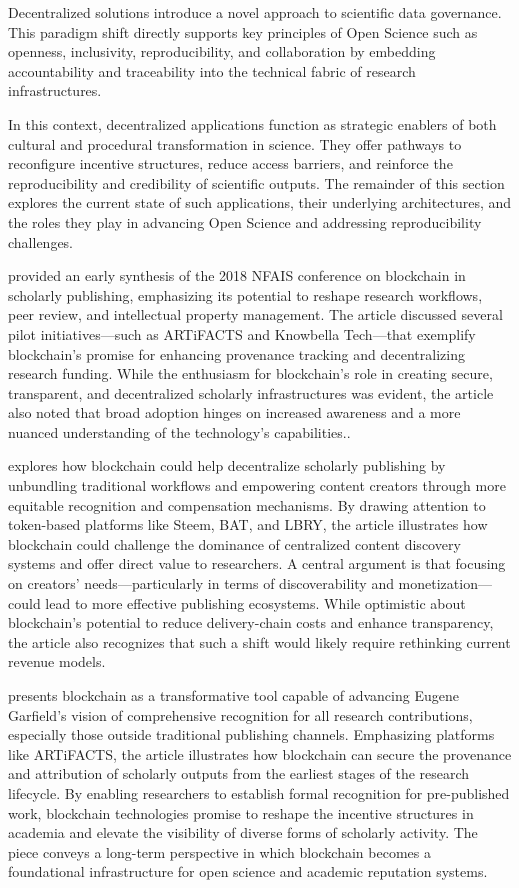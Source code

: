 \documentclass{article}
\begin{document}
Decentralized solutions introduce a novel approach to scientific data governance. This paradigm shift directly supports key principles of Open Science such as openness, inclusivity, reproducibility, and collaboration by embedding accountability and traceability into the technical fabric of research infrastructures.

In this context, decentralized applications function as strategic enablers of both cultural and procedural transformation in science. They offer pathways to reconfigure incentive structures, reduce access barriers, and reinforce the reproducibility and credibility of scientific outputs. The remainder of this section explores the current state of such applications, their underlying architectures, and the roles they play in advancing Open Science and addressing reproducibility challenges.

\cite{lawlor_overview_2018} provided an early synthesis of the 2018 NFAIS conference on blockchain in scholarly publishing, emphasizing its potential to reshape research workflows, peer review, and intellectual property management. The article discussed several pilot initiatives—such as ARTiFACTS and Knowbella Tech—that exemplify blockchain’s promise for enhancing provenance tracking and decentralizing research funding. While the enthusiasm for blockchain's role in creating secure, transparent, and decentralized scholarly infrastructures was evident, the article also noted that broad adoption hinges on increased awareness and a more nuanced understanding of the technology's capabilities..

\cite{holmen_blockchain_2018} explores how blockchain could help decentralize scholarly publishing by unbundling traditional workflows and empowering content creators through more equitable recognition and compensation mechanisms. By drawing attention to token-based platforms like Steem, BAT, and LBRY, the article illustrates how blockchain could challenge the dominance of centralized content discovery systems and offer direct value to researchers. A central argument is that focusing on creators' needs—particularly in terms of discoverability and monetization—could lead to more effective publishing ecosystems. While optimistic about blockchain’s potential to reduce delivery-chain costs and enhance transparency, the article also recognizes that such a shift would likely require rethinking current revenue models.

\cite{kochalko_making_2019} presents blockchain as a transformative tool capable of advancing Eugene Garfield’s vision of comprehensive recognition for all research contributions, especially those outside traditional publishing channels. Emphasizing platforms like ARTiFACTS, the article illustrates how blockchain can secure the provenance and attribution of scholarly outputs from the earliest stages of the research lifecycle. By enabling researchers to establish formal recognition for pre-published work, blockchain technologies promise to reshape the incentive structures in academia and elevate the visibility of diverse forms of scholarly activity. The piece conveys a long-term perspective in which blockchain becomes a foundational infrastructure for open science and academic reputation systems.
\end{document}
